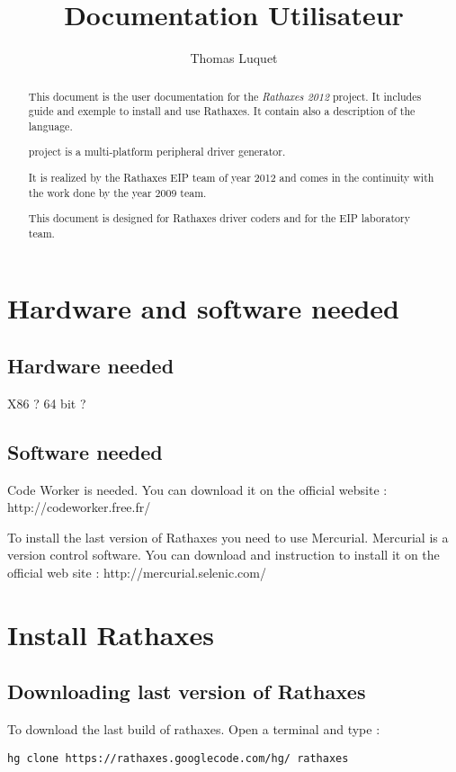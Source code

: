 \documentclass{rtxreport}
\title{Documentation Utilisateur}
\author{Thomas Luquet}
\begin{document}
\maketitle

\begin{abstract}
\rtx 


This document is the user documentation for the \emph{Rathaxes 2012} project. It
includes guide and exemple to install and use Rathaxes. It contain also a description of the language.

\rtx project is a multi-platform peripheral driver generator.

It is realized by the Rathaxes EIP team of year 2012 and comes in the
continuity with the work done by the year 2009 team.

This document is designed for Rathaxes driver coders and for the EIP laboratory
team.

\end{abstract}

\rtxmaketitleblock

\tableofcontents

\chapter{Hardware and software needed}

\section{Hardware needed}

X86 ? 64 bit ?

\section{Software needed}

Code Worker is needed. You can download it on the official website :
http://codeworker.free.fr/

To install the last version of Rathaxes you need to use Mercurial.
Mercurial is a version control software.
You can download and instruction to install it on the official web site :
http://mercurial.selenic.com/


\chapter{Install Rathaxes}

\section{Downloading last version of Rathaxes}
To download the last build of rathaxes. Open a terminal and type :
\begin{verbatim}
hg clone https://rathaxes.googlecode.com/hg/ rathaxes 
\end{verbatim}
\end{document}
